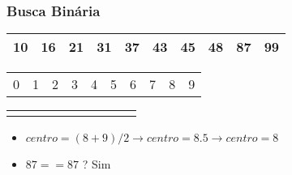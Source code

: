 \documentclass{beamer}
\begin{document}
\begin{frame}
    \frametitle{Busca Binária}
    \begin{center}
        \begin{table}
            \begin{tabular}{| p{0.25cm} | p{0.25cm} | p{0.25cm} | p{0.25cm} | p{0.25cm} | p{0.25cm} | p{0.25cm} | p{0.25cm} | p{0.25cm} | p{0.25cm} |}
                \hline
                10 & 16 & 21 & 31 & 37 & 43 & 45 & 48 & 87 & 99 \\ \hline
            \end{tabular}
            \begin{tabular}{p{0.25cm} p{0.25cm} p{0.25cm} p{0.25cm} p{0.25cm} p{0.25cm} p{0.25cm} p{0.25cm} p{0.25cm} p{0.25cm}}
                0 & 1 & 2 & 3 & 4 & 5 & 6 & 7 & 8 & 9
            \end{tabular}
            \begin{tabular}{p{0.25cm} p{0.25cm} p{0.25cm} p{0.25cm} p{0.25cm} p{0.25cm} p{0.25cm} p{0.25cm} p{0.25cm} p{0.25cm}}
                & & & & \color{blue}{$\uparrow$} & & & \color{blue}{$\uparrow$} & \color{red}{$\uparrow$} &
            \end{tabular}
        \end{table}
	\end{center}
    \begin{itemize}[<+->]
        \item $centro = (8 + 9) / 2 \rightarrow centro = 8.5 \rightarrow centro = 8$
        \item $87 == 87$ ? Sim
    \end{itemize}
\end{frame}
\end{document}
